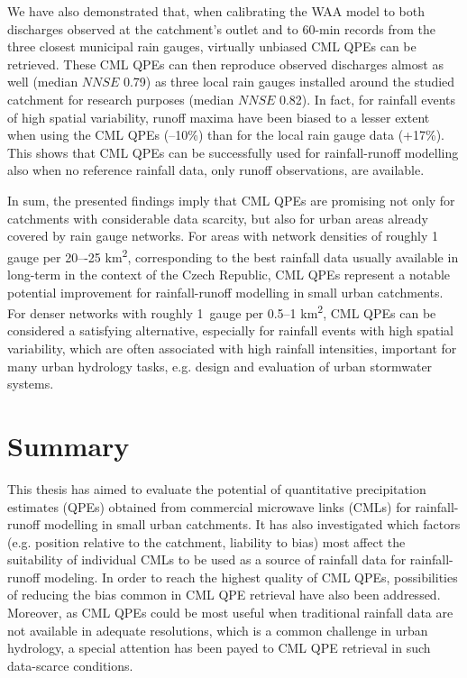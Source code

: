 \documentclass{ctuthesis}\usepackage[]{graphicx}\usepackage[]{color}
\begin{document}
We have also demonstrated that, when calibrating the WAA model to both discharges observed at the catchment's outlet and to 60-min records from the three closest municipal rain gauges, virtually unbiased CML QPEs can be retrieved. These CML QPEs can then reproduce observed discharges almost as well (median $N\!N\!S\!E$ 0.79) as three local rain gauges installed around the studied catchment for research purposes (median $N\!N\!S\!E$ 0.82). In fact, for rainfall events of high spatial variability, runoff maxima have been biased to a lesser extent when using the CML QPEs (--10\%) than for the local rain gauge data (+17\%). This shows that CML QPEs can be successfully used for rainfall-runoff modelling also when no reference rainfall data, only runoff observations, are available. 

In sum, the presented findings imply that CML QPEs are promising not only for catchments with considerable data scarcity, but also for urban areas already covered by rain gauge networks. For areas with network densities of roughly 1 gauge per 20–-25 km\textsuperscript{2}, corresponding to the best rainfall data usually available in long-term in the context of the Czech Republic, CML QPEs represent a notable potential improvement for rainfall-runoff modelling in small urban catchments. For denser networks with roughly  1~gauge per 0.5--1 km\textsuperscript{2}, CML QPEs can be considered a satisfying alternative, especially for rainfall events with high spatial variability, which are often associated with high rainfall intensities, important for many urban hydrology tasks, e.g. design and evaluation of urban stormwater systems. %



        


\chapter{Summary}    \label{chap_concl}


This thesis has aimed to evaluate the potential of quantitative precipitation estimates (QPEs) obtained from commercial microwave links (CMLs) for rainfall-runoff modelling in small urban catchments. It has also investigated which factors (e.g. position relative to the catchment, liability to bias) most affect the suitability of individual CMLs to be used as a source of rainfall data for rainfall-runoff modeling. In order to reach the highest quality of CML QPEs, possibilities of reducing the bias common in CML QPE retrieval have also been addressed. Moreover, as CML QPEs could be most useful when traditional rainfall data are not available in adequate resolutions, which is a common challenge in urban hydrology, a special attention has been payed to CML QPE retrieval in such data-scarce conditions.
\end{document}
